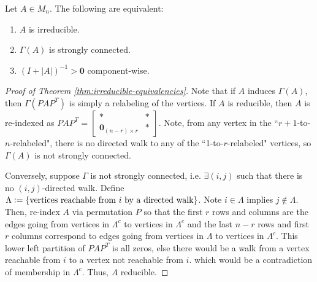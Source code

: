 \begin{theorem}
\label{thm:irreducible-equivalencies}
Let $A \in M_n$. The following are equivalent:
\begin{enumerate}
    \item $A$ is irreducible.
    \item $\Gamma(A)$ is strongly connected.
    \item $(I+|A|)^{-1} > \mathbf{0}$ component-wise.
\end{enumerate}
\end{theorem}
\begin{proof}[Proof of Theorem \ref{thm:irreducible-equivalencies}]
Note that if $A$ induces $\Gamma(A)$, then $\Gamma(PAP^T)$ is simply a relabeling of the vertices. If $A$ is reducible, then $A$ is re-indexed as 
$PAP^T = \left[
                \begin{array}{c|c}
                * & * \\
                \hline
                \mathbf{0}_{(n-r)\times r} & *
                \end{array}
            \right]$. 
Note, from any vertex in the ``$r+1$-to-$n$-relabeled", there is no directed walk to any of the ``1-to-$r$-relabeled" vertices, so $\Gamma(A)$ is not strongly connected.

Conversely, suppose $\Gamma$ is not strongly connected, i.e. $\exists (i,j)$ such that there is no $(i,j)$-directed walk. Define $\Lambda \vcentcolon= \{\text{vertices reachable from } i \text{ by a directed walk}\}$. Note $i \in \Lambda$ implies $j \not\in \Lambda$. Then, re-index $A$ via permutation $P$ so that the first $r$ rows and columns are the edges going from vertices in $\Lambda^c$ to vertices in $\Lambda^c$ and the last $n-r$ rows and first $r$ columns correspond to edges going from vertices in $\Lambda$ to vertices in $\Lambda^c$. This lower left partition of $PAP^T$ is all zeros, else there would be a walk from a vertex reachable from $i$ to a vertex not reachable from $i$. which would be a contradiction of membership in $\Lambda^c$. Thus, $A$ reducible.


\end{proof}
